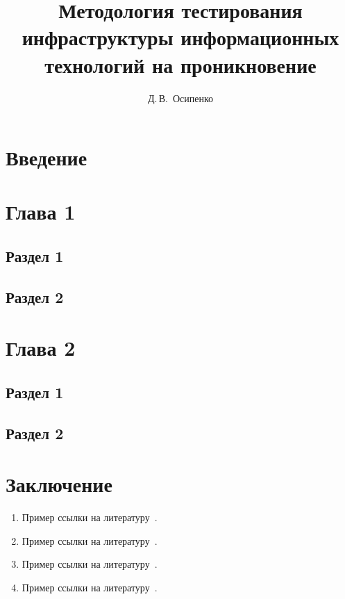 \documentclass[14pt, oneside]{altsu-report}
\title{Методология тестирования инфраструктуры информационных технологий на проникновение}
\author{Д.\,В.~Осипенко}
\institute{Институт цифровых технологий, электроники и физики}
\date{\the\year}
\begin{document}
\maketitle

\setcounter{page}{1}
\makeabstract
\tableofcontents

\chapter*{Введение}


\chapter{Глава 1}
\section{Раздел 1}
\section{Раздел 2}

\chapter{Глава 2}
\section{Раздел 1}
\section{Раздел 2}

\chapter*{Заключение}

\begin{enumerate}
\item Пример ссылки на литературу~\cite{wikiRUBitbucket}.
\item Пример ссылки на литературу~\cite{wikiRUIdSoftware}.
\item Пример ссылки на литературу~\cite{wikiRUGitHub}.
\item Пример ссылки на литературу~\cite{felker2010android}.
\end{enumerate}

\newpage
{}
\printbibliography[title={Список использованной литературы}]
\end{document}
